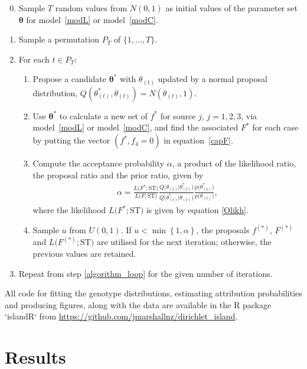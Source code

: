 \documentclass[AMA,STIX1COL]{WileyNJD-v2}
\begin{document}
\begin{enumerate}
\setcounter{enumi}{-1}
\item Sample $T$ random values from $N(0,1)$ as initial values of the parameter set $\boldsymbol{\theta}$ for model~\eqref{modL} or model~\eqref{modC}.
\item Sample a permutation $P_T$ of $\{1, \ldots, T\}$.\label{algorithm_loop}
\item For each $t \in P_T$:
\begin{enumerate}
\item Propose a candidate $\boldsymbol{\theta}^*$ with $\theta_{(t)}$ updated by a normal proposal distribution, $Q(\theta_{(t)}^*, \theta_{(t)}) = N(\theta_{(t)}, 1)$.

\item Use $\boldsymbol{\theta}^*$ to calculate a new set of $f^*$ for source $j$, $j=1, 2, 3$, via model~\eqref{modL} or model~\eqref{modC}, and find the associated $F^*$ for each case by putting the vector $(f^*, f_4=0)$ in equation~\eqref{capF}.

\item Compute the acceptance probability $\alpha$, a product of the likelihood ratio, the proposal ratio and the prior ratio, given by
\begin{align*}
\alpha=\frac{L\Big(F^*; \text{ST}\Big)}{L\Big(F; \text{ST}\Big)}\frac{Q\Big(\theta_{(t)} \vert \theta_{(t)}^*\Big)}{Q\Big(\theta_{(t)}^* \vert \theta_{(t)}\Big)}\frac{p\Big(\theta_{(t)}^*\Big)}{p\Big(\theta_{(t)}\Big)},
\end{align*}
where the likelihood $L\Big(F^*; \text{ST}\Big)$ is given by equation \eqref{Olikh}. \item Sample $u$ from $U(0,1)$. If $u < \min \left\{1, \alpha \right\}$, the proposals $f^{(*)}$, $F^{(*)}$ and $L\Big(F^{(*)}; \text{ST}\Big)$ are utilised for the next iteration; otherwise, the previous values are retained.
\end{enumerate}
\item Repeat from step \ref{algorithm_loop} for the given number of iterations.

\end{enumerate}

All code for fitting the genotype distributions, estimating attribution probabilities and producing figures, along with the data are available in the R package `islandR` from \url{https://github.com/jmarshallnz/dirichlet_island}.

\section{Results}
\end{document}

